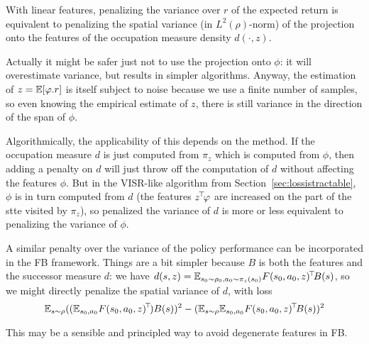 \documentclass[11pt,a4paper]{article}
\begin{document}
\begin{prop}
With linear features, penalizing the variance over $r$ of the expected
return is equivalent to penalizing the spatial variance (in
$L^2(\rho)$-norm) of the projection
onto the features of the occupation measure density $d(\cdot,z)$.
\end{prop}

Actually it might be safer just not to use the projection onto $\phi$:
it will overestimate variance, but results in simpler algorithms. Anyway,
the estimation of $z=\mathbb{E}[\varphi.r]$ is itself subject to noise because we
use a finite number of samples, so even
knowing the empirical estimate of $z$, there is still variance in the
direction of the span of $\phi$.

Algorithmically, the applicability of this depends on the method. If the
occupation measure $d$ is just computed from $\pi_z$ which is computed
from $\phi$, then adding a penalty on $d$ will just throw off the
computation of $d$ without affecting the features $\phi$. But in the
VISR-like algorithm from Section~\ref{sec:lossistractable}, $\phi$ is in
turn computed from $d$ (the features $z^{\!\top}\!\varphi$ are increased on
the part of the stte visited by $\pi_z$), so penalized the variance of $d$ is more or
less equivalent to penalizing the variance of $\phi$.


A similar penalty over the variance of the policy performance can be
incorporated in the FB framework. Things are a bit simpler because $B$ is
both the features and the successor measure $d$: we have
$d(s,z)=\mathbb{E}_{s_0\sim \rho_0,a_0\sim \pi_z(s_0)} F(s_0,a_0,z)^{\!\top}\!B(s)$, so
we might directly penalize the spatial variance of $d$, with loss
\begin{equation}
\mathbb{E}_{s\sim \rho} ((\mathbb{E}_{s_0,a_0} F(s_0,a_0,z)^{\!\top}\!)B(s))^2
-(
\mathbb{E}_{s\sim \rho} \mathbb{E}_{s_0,a_0} F(s_0,a_0,z)^{\!\top}\!B(s)
)^2
\end{equation}

This may be a sensible and principled way to avoid degenerate
features in FB.



\end{document}
